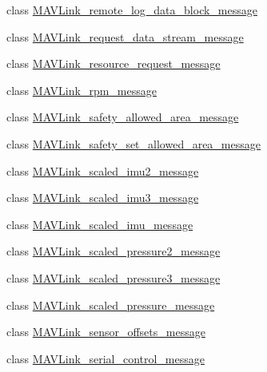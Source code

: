 \begin{DoxyCompactItemize}
\item 
class \hyperlink{classpymavlink_1_1dialects_1_1v10_1_1MAVLink__remote__log__data__block__message}{M\+A\+V\+Link\+\_\+remote\+\_\+log\+\_\+data\+\_\+block\+\_\+message}
\item 
class \hyperlink{classpymavlink_1_1dialects_1_1v10_1_1MAVLink__request__data__stream__message}{M\+A\+V\+Link\+\_\+request\+\_\+data\+\_\+stream\+\_\+message}
\item 
class \hyperlink{classpymavlink_1_1dialects_1_1v10_1_1MAVLink__resource__request__message}{M\+A\+V\+Link\+\_\+resource\+\_\+request\+\_\+message}
\item 
class \hyperlink{classpymavlink_1_1dialects_1_1v10_1_1MAVLink__rpm__message}{M\+A\+V\+Link\+\_\+rpm\+\_\+message}
\item 
class \hyperlink{classpymavlink_1_1dialects_1_1v10_1_1MAVLink__safety__allowed__area__message}{M\+A\+V\+Link\+\_\+safety\+\_\+allowed\+\_\+area\+\_\+message}
\item 
class \hyperlink{classpymavlink_1_1dialects_1_1v10_1_1MAVLink__safety__set__allowed__area__message}{M\+A\+V\+Link\+\_\+safety\+\_\+set\+\_\+allowed\+\_\+area\+\_\+message}
\item 
class \hyperlink{classpymavlink_1_1dialects_1_1v10_1_1MAVLink__scaled__imu2__message}{M\+A\+V\+Link\+\_\+scaled\+\_\+imu2\+\_\+message}
\item 
class \hyperlink{classpymavlink_1_1dialects_1_1v10_1_1MAVLink__scaled__imu3__message}{M\+A\+V\+Link\+\_\+scaled\+\_\+imu3\+\_\+message}
\item 
class \hyperlink{classpymavlink_1_1dialects_1_1v10_1_1MAVLink__scaled__imu__message}{M\+A\+V\+Link\+\_\+scaled\+\_\+imu\+\_\+message}
\item 
class \hyperlink{classpymavlink_1_1dialects_1_1v10_1_1MAVLink__scaled__pressure2__message}{M\+A\+V\+Link\+\_\+scaled\+\_\+pressure2\+\_\+message}
\item 
class \hyperlink{classpymavlink_1_1dialects_1_1v10_1_1MAVLink__scaled__pressure3__message}{M\+A\+V\+Link\+\_\+scaled\+\_\+pressure3\+\_\+message}
\item 
class \hyperlink{classpymavlink_1_1dialects_1_1v10_1_1MAVLink__scaled__pressure__message}{M\+A\+V\+Link\+\_\+scaled\+\_\+pressure\+\_\+message}
\item 
class \hyperlink{classpymavlink_1_1dialects_1_1v10_1_1MAVLink__sensor__offsets__message}{M\+A\+V\+Link\+\_\+sensor\+\_\+offsets\+\_\+message}
\item 
class \hyperlink{classpymavlink_1_1dialects_1_1v10_1_1MAVLink__serial__control__message}{M\+A\+V\+Link\+\_\+serial\+\_\+control\+\_\+message}

\end{DoxyCompactItemize}
